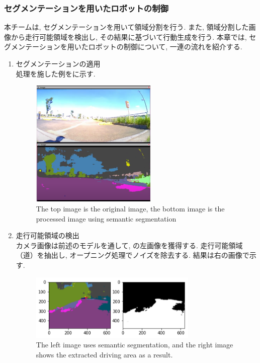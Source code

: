 \documentclass[uplatex, twocolumn, 9pt]{jsproceedings}
\begin{document}
\subsubsection{セグメンテーションを用いたロボットの制御}
本チームは, セグメンテーションを用いて領域分割を行う. また, 領域分割した画像から走行可能領域を検出し, その結果に基づいて行動生成を行う. 本章では, セグメンテーションを用いたロボットの制御について, 一連の流れを紹介する. 

\begin{enumerate}
  \item セグメンテーションの適用\\
  処理を施した例をに示す.
  \begin{figure}[h]
    \centering
    \includegraphics[width=60mm]{fig/camera_for_seg.pdf}
    \caption{The top image is the original image, the bottom image is the processed image using semantic segmentation}
    \label{fig:for_seg}%
  \end{figure}
  \item 走行可能領域の検出\\
  カメラ画像は前述のモデルを通して, の左画像を獲得する. 走行可能領域（道）を抽出し, オープニング処理でノイズを除去する. 結果は右の画像で示す.
  \begin{figure}[h]
    \centering
    \includegraphics[width=80mm]{fig/seg_runarea.pdf}
    \caption{The left image uses semantic segmentation, and the right image shows the extracted driving area as a result.}
    \label{fig:seg_runarea}%

\end{figure}
\end{enumerate}
\end{document}
